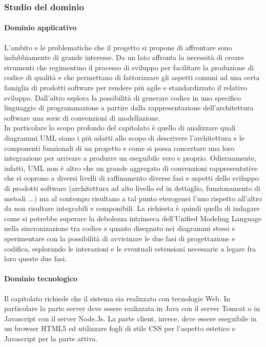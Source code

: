 		\subsubsection{Studio del dominio}
			\paragraph{Dominio applicativo}
			L'ambito e le problematiche che il progetto si propone di affrontare sono indubbiamente di grande interesse. Da un lato affronta la necessità di 
			creare strumenti che regimentino il processo di sviluppo per facilitare la produzione di codice di qualità e che permettano di fattorizzare gli 
			aspetti comuni ad una certa famiglia di prodotti software per rendere più agile e standardizzato il relativo sviluppo.
			Dall'altro esplora la possibilità di generare codice in uno specifico linguaggio di programmazione a partire dalla rappresentazione dell'architettura 
			software una serie di convenzioni di modellazione.
			\\In particolare lo scopo profondo del capitolato è quello di analizzare quali diagrammi UML siano i più adatti allo scopo di descrivere l'architettura 
			e le componenti funzionali di un progetto e come si possa concertare una loro integrazione per arrivare a produrre un eseguibile vero e proprio. 
			Odiernamente, infatti, UML non è altro che un grande aggregato di convenzioni rappresentative che sì coprono a diversi livelli di raffinamento diverse 
			fasi e aspetti dello sviluppo di prodotti software (architettura ad alto livello ed in dettaglio, funzionamento di metodi ...) ma al contempo risultano 
			a tal punto eterogenei l'uno rispetto all'altro da non risultare integrabili e componibili. 
			La richiesta è quindi quella di indagare come si potrebbe superare la debolezza intrinseca dell'Unified Modeling Language nella sincronizazione tra 
			codice e quanto disegnato nei diagrammi stessi e sperimentare con la possibilità di avvicinare le due fasi di progettazione e codifica, esplorando le 
			interazioni e le eventuali estensioni necessarie a legare fra loro queste due fasi.
			\paragraph{Dominio tecnologico}
			Il capitolato richiede che il sistema sia realizzato con tecnologie Web. In particolare la parte server deve essere realizzata in Java con il server 
			Tomcat o in Javascript con il server Node.Js. La parte client, invece, deve essere eseguibile in un browser HTML5 ed utilizzare fogli di stile CSS per 
			l'aspetto estetico e Javascript per la parte attiva.
